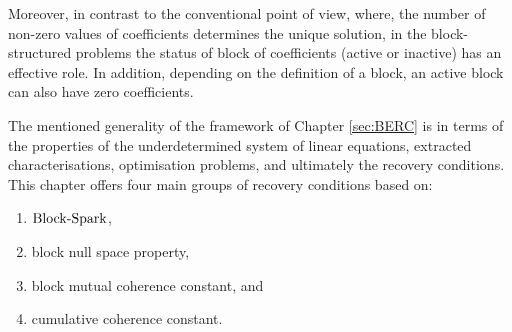 Moreover, in contrast to the conventional point of view, where, the number of non-zero values of coefficients determines the unique solution, in the block-structured problems the status of block of coefficients (active or inactive) has an effective role.
In addition, depending on the definition of a block, an active block can also have zero coefficients.








The mentioned generality of the framework of Chapter \ref{sec:BERC} is in terms of the properties of the underdetermined system of linear equations, extracted characterisations, optimisation problems, and ultimately the recovery conditions.
This chapter offers four main groups of recovery conditions based on:
\begin{enumerate}
  \item $\mathrm{Block\text{{-}}Spark}$,
  \item block null space property,
  \item block mutual coherence constant, and
  \item cumulative coherence constant.
\end{enumerate}

